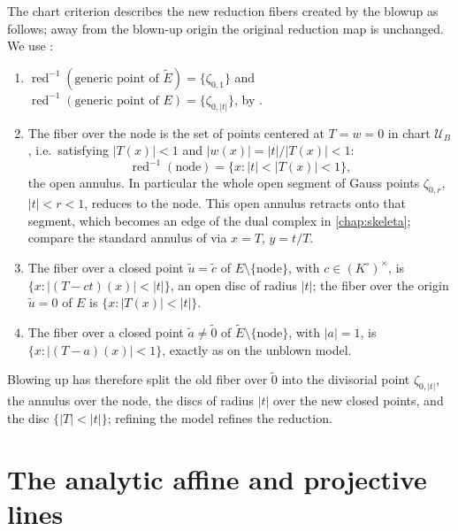 \begin{example}
The chart criterion describes the new reduction fibers created by the
blowup as follows; away from the blown-up origin the original reduction
map is unchanged. We use
:
\begin{enumerate}
\item $\operatorname{red}^{-1}(\text{generic point of }\widetilde E)
      =\{\zeta_{0,1}\}$ and
      $\operatorname{red}^{-1}(\text{generic point of }E)
      =\{\zeta_{0,|t|}\}$, by
      .
\item The fiber over the node is the set of points centered at
      $T=w=0$ in chart $\mathcal U_B$, i.e.\ satisfying
      $|T(x)|<1$ and $|w(x)|=|t|/|T(x)|<1$:
      \[
       \operatorname{red}^{-1}(\text{node})
       =\{x:|t|<|T(x)|<1\},
      \]
      the open annulus.  In particular the whole open segment of Gauss
      points $\zeta_{0,r}$, $|t|<r<1$, reduces to the node.  This
      open annulus retracts onto that segment, which becomes an edge of
      the dual complex in \cref{chap:skeleta}; compare the standard
      annulus of  via $x=T$,
      $y=t/T$.
\item The fiber over a closed point $\tilde u=\tilde c$ of
      $E\setminus\{\text{node}\}$, with $c\in(K^\circ)^\times$, is
      $\{x:|(T-ct)(x)|<|t|\}$, an open disc of radius $|t|$; the
      fiber over the origin $\tilde u=0$ of $E$ is
      $\{x:|T(x)|<|t|\}$.
\item The fiber over a closed point $\tilde a\neq\tilde 0$ of
      $\widetilde E\setminus\{\text{node}\}$, with $|a|=1$, is
      $\{x:|(T-a)(x)|<1\}$, exactly as on the unblown model.
\end{enumerate}
Blowing up has therefore split the old fiber over $\tilde 0$ into the
divisorial point $\zeta_{0,|t|}$, the annulus over the node, the discs
of radius $|t|$ over the new closed points, and the disc
$\{|T|<|t|\}$; refining the model refines the reduction.
\end{example}

\section{The analytic affine and projective lines}
\label{sec:berk-line}

